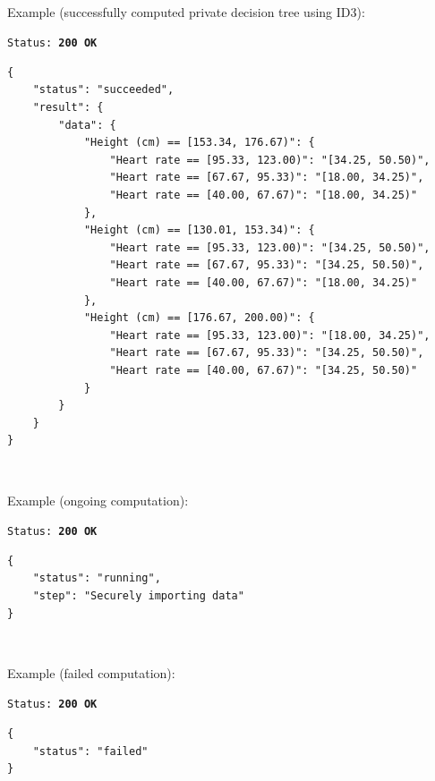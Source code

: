\begin{description}[labelwidth=5em, leftmargin=\dimexpr\labelwidth+\labelsep\relax]
\ \\
\begin{minipage}{\linewidth}
  Example (successfully computed private decision tree using ID3):\\
{
\texttt{Status: {\color{ForestGreen}\textbf{200 OK}}}
\begin{verbatim}
{
    "status": "succeeded",
    "result": {
        "data": {
            "Height (cm) == [153.34, 176.67)": {
                "Heart rate == [95.33, 123.00)": "[34.25, 50.50)",
                "Heart rate == [67.67, 95.33)": "[18.00, 34.25)",
                "Heart rate == [40.00, 67.67)": "[18.00, 34.25)"
            },
            "Height (cm) == [130.01, 153.34)": {
                "Heart rate == [95.33, 123.00)": "[34.25, 50.50)",
                "Heart rate == [67.67, 95.33)": "[34.25, 50.50)",
                "Heart rate == [40.00, 67.67)": "[18.00, 34.25)"
            },
            "Height (cm) == [176.67, 200.00)": {
                "Heart rate == [95.33, 123.00)": "[18.00, 34.25)",
                "Heart rate == [67.67, 95.33)": "[34.25, 50.50)",
                "Heart rate == [40.00, 67.67)": "[34.25, 50.50)"
            }
        }
    }
}
\end{verbatim}
\label{sc:get-response-sucessful-4}
}
\end{minipage}

\ \\
\begin{minipage}{\linewidth}
  Example (ongoing computation):\\
{
\texttt{Status: {\color{ForestGreen}\textbf{200 OK}}}
\begin{verbatim}
{
    "status": "running",
    "step": "Securely importing data"
}
\end{verbatim}
\label{sc:get-response-running}
}
\end{minipage}

\ \\
\begin{minipage}{\linewidth}
  Example (failed computation):\\
{
\texttt{Status: {\color{ForestGreen}\textbf{200 OK}}}
\begin{verbatim}
{
    "status": "failed"
}
\end{verbatim}
\label{sc:get-response-failed}
}
\end{minipage}


\end{description}



